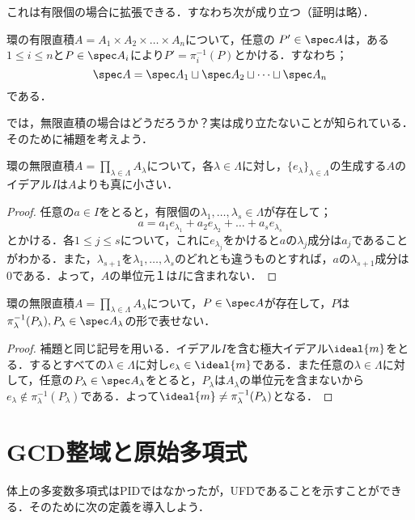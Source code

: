 これは有限個の場合に拡張できる．すなわち次が成り立つ（証明は略）．

\begin{prop}
	環の有限直積$A=A_1\times A_2\times\dots\times A_n$について，任意の $P'\in\spec A$は，ある$1\leq i\leq n$と$P\in\spec A_i$により$P'=\pi_i^{-1}(P)$とかける．すなわち；
	\[\spec A=\spec A_1\sqcup\spec A_2\sqcup\dots\sqcup\spec A_n\]
	である．
\end{prop}

では，無限直積の場合はどうだろうか？実は成り立たないことが知られている．そのために補題を考えよう．

\begin{lem}
	環の無限直積$A=\prod_{\lambda\in\Lambda}A_\lambda$について，各$\lambda\in \Lambda$に対し，$\{e_\lambda\}_{\lambda\in\Lambda}$の生成する$A$のイデアル$I$は$A$よりも真に小さい．
\end{lem}

\begin{proof}
	任意の$a\in I$をとると，有限個の$\lambda_1,\dots,\lambda_s\in \Lambda$が存在して；
	\[a=a_1e_{\lambda_1}+a_2e_{\lambda_2}+\dots+a_se_{\lambda_s}\]
	とかける．各$1\leq j\leq s$について，これに$e_{\lambda_j}$をかけると$a$の$\lambda_j$成分は$a_j$であることがわかる．また，$\lambda_{s+1}$を$\lambda_1,\dots,\lambda_s$のどれとも違うものとすれば，$a$の$\lambda_{s+1}$成分は0である．よって，$A$の単位元$１$は$I$に含まれない．
\end{proof}

\begin{prop}
	環の無限直積$A=\prod_{\lambda\in \Lambda}A_\lambda$について，$P\in\spec A$が存在して，$P$は$\pi^{-1}_\lambda(P_\lambda),P_\lambda\in\spec A_\lambda$の形で表せない．
\end{prop}

\begin{proof}
	補題と同じ記号を用いる．イデアル$I$を含む極大イデアル$\ideal{m}$をとる．するとすべての$\lambda\in \Lambda$に対し$e_\lambda\in\ideal{m}$である．また任意の$\lambda\in \Lambda$に対して，任意の$P_\lambda\in\spec A_\lambda$をとると，$P_\lambda$は$A_\lambda$の単位元を含まないから$e_\lambda\not\in\pi^{-1}_\lambda(P_\lambda)$である．よって$\ideal{m}\neq\pi_\lambda^{-1}(P_\lambda)$となる．
\end{proof}

\section{GCD整域と原始多項式}
体上の多変数多項式はPIDではなかったが，UFDであることを示すことができる．そのために次の定義を導入しよう．

